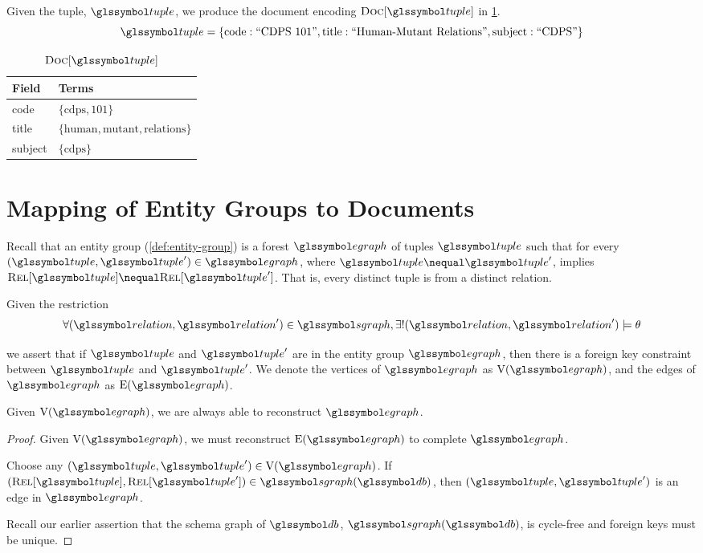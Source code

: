 		\begin{ex}
			Given the tuple, \(\tuple\), we produce the document encoding \(\docs{\tuple}\) in \cref{tbl:docs-tuple}.
			\[
				\tuple = \{\text{code}: \text{``CDPS 101''}, \text{title}: \text{``Human-Mutant Relations''}, \text{subject}: \text{``CDPS''}\}
			\]
			
			\begin{table}
				\centering
				
				\begin{tabular}{ll}
					\toprule
					Field & Terms \\
					\midrule
					code & \(\{\text{cdps}, \text{101}\}\) \\
					title & \(\{\text{human}, \text{mutant}, \text{relations}\}\) \\
					subject & \(\{\text{cdps}\}\) \\
					\bottomrule
				\end{tabular}
				
				\caption{\(\docs{\tuple}\)}
				\label{tbl:docs-tuple}
			\end{table}
		\end{ex}

	
	\section{Mapping of Entity Groups to Documents}
	\label{sec:mapping-entity-groups-to-documents}
		Recall that an entity group (\cref{def:entity-group}) is a forest \(\egraph\) of tuples \(\tuple\) such that for every \((\tuple, \tuple') \in \egraph\), where \(\tuple \nequal \tuple'\), implies \(\relations{\tuple} \nequal \relations{\tuple'}\).  That is, every distinct tuple is from a distinct relation.
		
		Given the restriction
		\[
			\forall (\relation, \relation') \in \sgraph, \exists! (\relation, \relation') \models \theta
		\]
		
		we assert that if \(\tuple\) and \(\tuple'\) are in the entity group \(\egraph\), then there is a foreign key constraint between \(\tuple\) and \(\tuple'\).  We denote the vertices of \(\egraph\) as \(\text{V}(\egraph)\), and the edges of \(\egraph\) as \(\text{E}(\egraph)\).
		
		\begin{claim}
		\label{clm:lossless}
			Given \(\text{V}(\egraph)\), we are always able to reconstruct \(\egraph\).
		\end{claim}
		
		\begin{proof}
			Given \(\text{V}(\egraph)\), we must reconstruct \(\text{E}(\egraph)\) to complete \(\egraph\).
			
			Choose any \((\tuple, \tuple') \in \text{V}(\egraph)\).	If \((\relations{\tuple}, \relations{\tuple'}) \in \sgraph(\db)\), then \((\tuple, \tuple')\) is an edge in \(\egraph\).
			
			Recall our earlier assertion that the schema graph of \(\db\), \(\sgraph(\db)\), is cycle-free and foreign keys must be unique.
		\end{proof}
		
